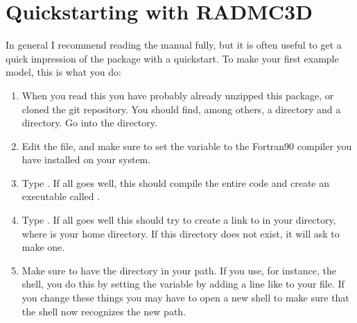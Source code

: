 \documentclass[letterpaper,10pt,english]{sphinxmanual}
\begin{document}
\chapter{Quickstarting with RADMC\sphinxhyphen{}3D}
\label{\detokenize{quickstart:quickstarting-with-radmc-3d}}\label{\detokenize{quickstart:chap-quick-start}}\label{\detokenize{quickstart::doc}}
In general I recommend reading the manual fully, but it is often useful
to get a quick impression of the package with a quick\sphinxhyphen{}start. To make your
first example model, this is what you do:
\begin{enumerate}
%
\item {} 
When you read this you have probably already unzipped this package, or
cloned the git repository.
You should find, among others, a  directory and a
 directory. Go into the  directory.

\item {} 
Edit the  file, and make sure to set the
 variable to the Fortran\sphinxhyphen{}90 compiler you have installed on
your system.

\item {} 
Type . If all goes well, this should compile the
entire code and create an executable called .

\item {} 
Type . If all goes well this should try to
create a link to  in your 
directory, where  is your home directory.
If this  directory does not exist, it will ask to make one.

\item {} 
Make sure to have the  directory in your path.  If
you use, for instance, the  shell, you do this by setting the
 variable by adding a line like  to your  file. If you
change these things you may have to open a new shell to make sure that the
shell now recognizes the new path.


\end{enumerate}
\end{document}
